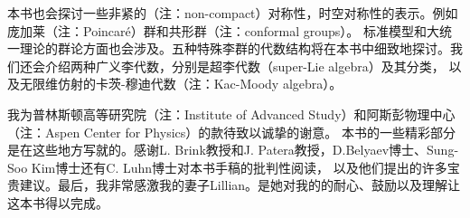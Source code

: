 \documentclass[UTF8]{book}
\begin{document}
本书也会探讨一些非紧的（注：non-compact）对称性，时空对称性的表示。例如庞加莱（注：Poincaré）群和共形群（注：conformal groups）。
标准模型和大统一理论的群论方面也会涉及。五种特殊李群的代数结构将在本书中细致地探讨。我们还会介绍两种广义李代数，分别是超李代数（super-Lie algebra）及其分类，
以及无限维仿射的卡茨-穆迪代数（注：Kac-Moody algebra）。

我为普林斯顿高等研究院（注：Institute of Advanced Study）和阿斯彭物理中心（注：Aspen Center for Physics）的款待致以诚挚的谢意。
本书的一些精彩部分是在这些地方写就的。感谢L. Brink教授和J. Patera教授，D.Belyaev博士、Sung-Soo Kim博士还有C. Luhn博士对本书手稿的批判性阅读，
以及他们提出的许多宝贵建议。最后，我非常感激我的妻子Lillian。是她对我的的耐心、鼓励以及理解让这本书得以完成。
\end{document}
